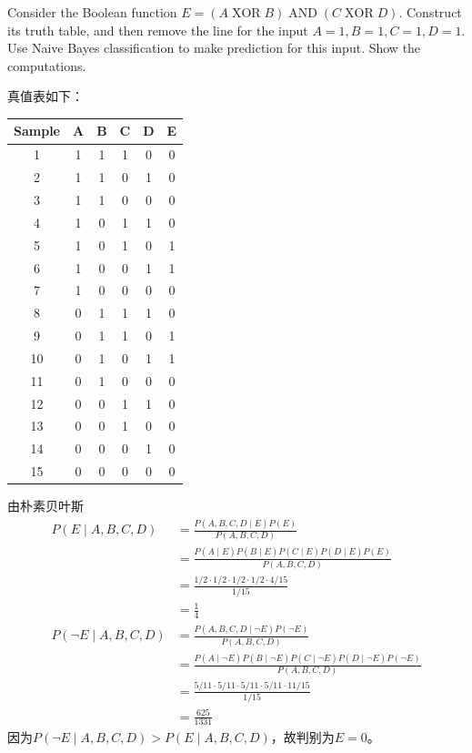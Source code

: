 \documentclass[a4paper, 11pt]{article}
\begin{document}
\begin{question}\normalfont
Consider the Boolean function $E = (A\;\mathrm{XOR}\;B) \;\mathrm{AND}\; (C\;\mathrm{XOR}\;D)$. Construct its truth table, and then remove the line for the input $A = 1, B = 1, C = 1, D = 1$. Use Naive Bayes classification to make prediction for this input. Show the computations.
\end{question}
\begin{answer}
真值表如下：
\begin{center}
\begin{longtable}{|c|c|c|c|c|c|}\hline
Sample & A & B & C & D & E\\\hline
1 & 1 & 1 & 1 & 0 & 0\\\hline
2 & 1 & 1 & 0 & 1 & 0\\\hline
3 & 1 & 1 & 0 & 0 & 0\\\hline
4 & 1 & 0 & 1 & 1 & 0\\\hline
5 & 1 & 0 & 1 & 0 & 1\\\hline
6 & 1 & 0 & 0 & 1 & 1\\\hline
7 & 1 & 0 & 0 & 0 & 0\\\hline
8 & 0 & 1 & 1 & 1 & 0\\\hline
9 & 0 & 1 & 1 & 0 & 1\\\hline
10 & 0 & 1 & 0 & 1 & 1\\\hline
11 & 0 & 1 & 0 & 0 & 0\\\hline
12 & 0 & 0 & 1 & 1 & 0\\\hline
13 & 0 & 0 & 1 & 0 & 0\\\hline
14 & 0 & 0 & 0 & 1 & 0\\\hline
15 & 0 & 0 & 0 & 0 & 0\\\hline
\end{longtable}
\end{center}
由朴素贝叶斯
\[\begin{aligned}
P(E\mid A,B,C,D)
&=\frac{P(A,B,C,D\mid E)P(E)}{P(A,B,C,D)}\\
&=\frac{P(A\mid E) P(B\mid E) P(C\mid E) P(D\mid E) P(E)}{P(A,B,C,D)}\\
&=\frac{1/2\cdot 1/2\cdot 1/2\cdot 1/2\cdot 4/15}{1/15}\\
&=\frac{1}{4}\\
P(\lnot E\mid A,B,C,D)
&=\frac{P(A,B,C,D\mid \lnot E)P(\lnot E)}{P(A,B,C,D)}\\
&=\frac{P(A\mid \lnot E) P(B\mid \lnot E) P(C\mid \lnot E) P(D\mid \lnot E) P(\lnot E)}{P(A,B,C,D)}\\
&=\frac{5/11\cdot 5/11\cdot 5/11\cdot 5/11\cdot 11/15}{1/15}\\
&=\frac{625}{1331}
\end{aligned}\]
因为$P(\lnot E\mid A,B,C,D)>P(E\mid A,B,C,D)$，故判别为$E=0$。
\end{answer}
\end{document}
